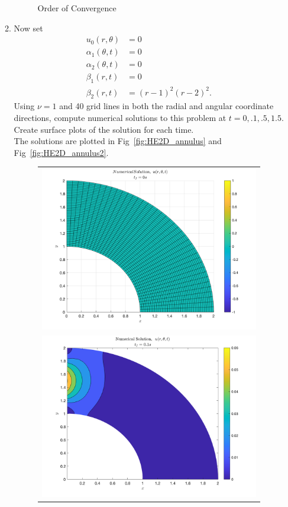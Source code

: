 \documentclass[11pt]{article}
\begin{document}
\begin{enumerate}
\begin{enumerate}
\begin{figure}[htp]
        \caption{Order of Convergence}
        \label{fig:convergence_2D}
    \end{figure}
    \item {\color{blue}Now set} 
    \begin{align*}
      u_0(r,\theta) & = 0\\
      \alpha_1(\theta,t) & = 0\\
      \alpha_2(\theta,t) & = 0\\
      \beta_1(r,t) & = 0\\
      \beta_2(r,t) & = (r-1)^2(r-2)^2.
    \end{align*}
    {\color{blue}Using $\nu=1$ and 40 grid lines in both the radial and angular coordinate directions, compute numerical solutions to this problem at $t=0,.1,.5,1.5$. Create surface plots of the solution for each time. }\\
    The solutions are plotted in Fig~\ref{fig:HE2D_annulus} and Fig~\ref{fig:HE2D_annulus2}. 
    \begin{figure}[htp]
        \centering
        \begin{tabular}{c}
            \includegraphics[width=5in]{Plot1.png} \\
            \includegraphics[width=5in]{Plot2.png} \\

\end{tabular}
\end{figure}
\end{enumerate}
\end{enumerate}
\end{document}
